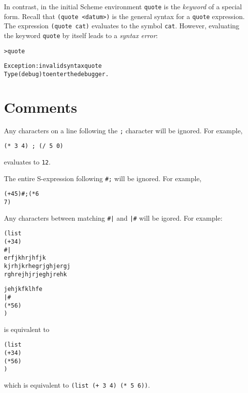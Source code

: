 \documentclass{book}
\begin{document}
In contrast, in the initial Scheme environment \verb|quote| is the \emph{keyword} of a special form.  Recall that \verb|(quote <datum>)| is the general syntax for a \verb|quote| expression.  The expression \verb|(quote cat)| evaluates to the symbol \verb|cat|.  However, evaluating the keyword \verb|quote| by itself leads to a \emph{syntax error}:

\begin{alltt}
> quote

Exception: invalid syntax quote
Type (debug) to enter the debugger.
\end{alltt}


\section{Comments}


Any characters on a line following the \verb|;| character will be ignored.  For example,

\verb|(* 3 4) ; (/ 5 0)|

\noindent
evaluates to \verb|12|.

The entire S-expression following \verb|#;| will be ignored.  For example,

\begin{alltt}
(+ 4 5) #;(* 6
             7)
\end{alltt}
  
Any characters between matching \texttt{\#|} and \texttt{|\#} will be igored.  For example:

\begin{alltt}
(list
  (+ 3 4)
  #|
  erfjkhrj hfjk
  kjrhjkrheg rjghjer gj
  rghrejhj rjegh jrehk
  
  jehjkf klh fe
  |#
  (* 5 6)
  )
\end{alltt}

\noindent
is equivalent to

\begin{alltt}
(list
  (+ 3 4)
  (* 5 6)
  )
\end{alltt}

\noindent
which is equivalent to \verb|(list (+ 3 4) (* 5 6))|.

\end{document}
